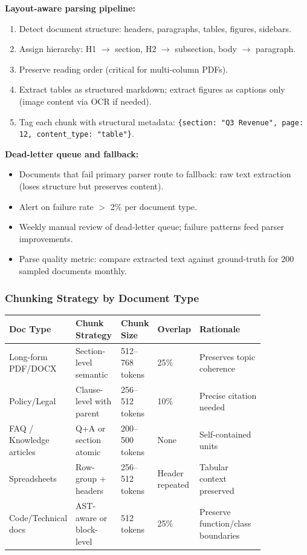 \textbf{Layout-aware parsing pipeline:}

\begin{enumerate}
  \item Detect document structure: headers, paragraphs, tables, figures, sidebars.
  \item Assign hierarchy: H1 $\rightarrow$ section, H2 $\rightarrow$ subsection, body $\rightarrow$ paragraph.
  \item Preserve reading order (critical for multi-column PDFs).
  \item Extract tables as structured markdown; extract figures as captions only (image content via OCR if needed).
  \item Tag each chunk with structural metadata: \texttt{\{section: "Q3 Revenue", page: 12, content\_type: "table"\}}.
\end{enumerate}

\textbf{Dead-letter queue and fallback:}

\begin{itemize}
  \item Documents that fail primary parser route to fallback: raw text extraction (loses structure but preserves content).
  \item Alert on failure rate $>$ 2\% per document type.
  \item Weekly manual review of dead-letter queue; failure patterns feed parser improvements.
  \item Parse quality metric: compare extracted text against ground-truth for 200 sampled documents monthly.
\end{itemize}

\subsubsection*{Chunking Strategy by Document Type}

\small
\begin{tabular}{|p{0.14\linewidth}|p{0.18\linewidth}|p{0.14\linewidth}|p{0.10\linewidth}|p{0.28\linewidth}|}
\hline
\textbf{Doc Type} & \textbf{Chunk Strategy} & \textbf{Chunk Size} & \textbf{Overlap} & \textbf{Rationale} \\
\hline
Long-form PDF/DOCX & Section-level semantic & 512--768 tokens & 25\% & Preserves topic coherence \\
\hline
Policy/Legal & Clause-level with parent & 256--512 tokens & 10\% & Precise citation needed \\
\hline
FAQ / Knowledge articles & Q+A or section atomic & 200--500 tokens & None & Self-contained units \\
\hline
Spreadsheets & Row-group + headers & 256--512 tokens & Header repeated & Tabular context preserved \\
\hline
Code/Technical docs & AST-aware or block-level & 512 tokens & 25\% & Preserve function/class boundaries \\
\hline
\end{tabular}
\normalsize

